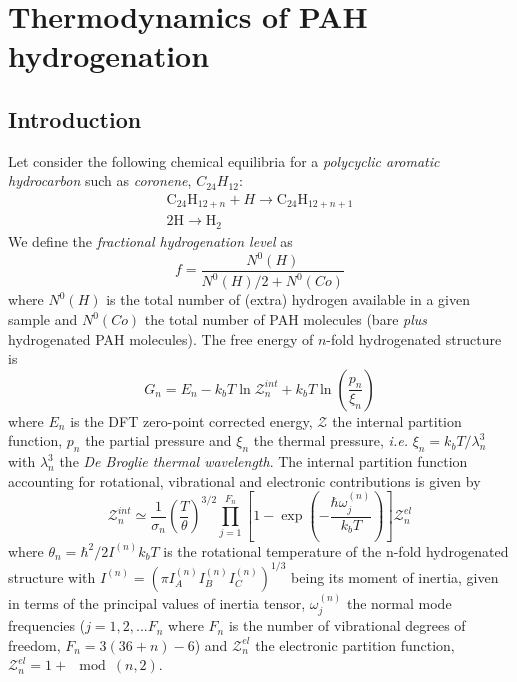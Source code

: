 \documentclass[a4paper, 11pt, twoside]{book}
\begin{document}
\chapter*{Thermodynamics of PAH hydrogenation}

\section*{Introduction}
Let consider the following chemical equilibria for a \emph{polycyclic aromatic hydrocarbon} such as \emph{coronene}, $C_{24}H_{12}$:
\begin{gather}
    \text{C}_{24}\text{H}_{12+n} + H \rightarrow \text{C}_{24}\text{H}_{12+n+1} \nonumber \\
    2\text{H} \rightarrow \text{H}_2 \nonumber
\end{gather}
We define the \emph{fractional hydrogenation level} as
\begin{equation}
    f=\frac{N^0(H)}{N^0(H)/2+N^0(Co)} 
\end{equation}
where $N^0(H)$ is the total number of (extra) hydrogen available in a given sample and $N^0(Co)$ the total number of PAH molecules (bare \emph{plus} hydrogenated PAH molecules).
The free energy of $n$-fold hydrogenated structure is
\begin{equation}
    G_{n} = E_n - k_bT \ln{\mathcal{Z}^{int}_n}+k_bT\ln{\left(\frac{p_n}{\xi_n}\right)} \nonumber
\end{equation}
where $E_n$ is the DFT zero-point corrected energy, $\mathcal{Z}$ the internal partition function, $p_n$ the partial pressure and $\xi_n$ the thermal pressure, \emph{i.e.} $\xi_n=k_bT/\lambda_n^3$with $\lambda_n^3$ the \emph{De Broglie thermal wavelength}. The internal partition function accounting for rotational, vibrational and electronic contributions is given by
\begin{equation}
    \mathcal{Z}^{int}_{n} \simeq \frac{1}{\sigma_n}\left( \frac{T}{\theta}\right)^{3/2}\prod_{j=1}^{F_n}\left[1-\exp\left(-\frac{\hbar\omega_j^{(n)}}{k_bT}\right)\right]\mathcal{Z}_{n}^{el}  \label{eqapp:zint}
\end{equation}
where $\theta_n=\hbar^2/2I^{(n)}k_bT$ is the rotational temperature of the n-fold hydrogenated structure with $I^{(n)} = (\pi I^{(n)}_AI^{(n)}_BI^{(n)}_C)^{1/3}$ being its moment of inertia, given in terms of the principal values of inertia tensor, $\omega^{(n)}_j$ the normal mode frequencies ($j=1,2,...F_n$ where $F_n$ is the number of vibrational degrees of freedom, $F_n=3(36+n)-6$) and $\mathcal{Z}^{el}_n$ the electronic partition function, $\mathcal{Z}^{el}_n = 1+\mod(n,2)$.
\end{document}
